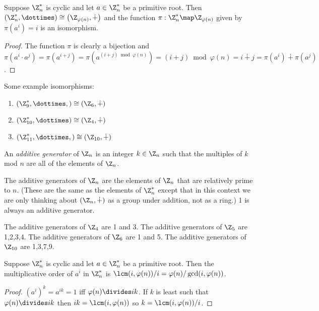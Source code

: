 \documentclass[oneside,12pt]{amsart}
\begin{document}
\begin{theorem}
Suppose $\Z^*_n$ is cyclic and let $a\in\Z^*_n$ be a primitive root. Then $\left(\Z^*_n, \dottimes\right ) \cong \left(\Z_{\varphi(n)},\dotplus \right)$
and the function $\pi:\Z^*_n\map\Z_{\varphi(n)}$ given by $\pi(a^i) = i$ is an isomorphism.
\end{theorem}
\begin{proof}
The function $\pi$ is clearly a bijection and $\pi(a^i \cdot a^j) = \pi(a^{i+j}) = \pi(a^{(i+j)\bmod \varphi(n)}) = (i+j)\bmod \varphi(n) = i \dotplus j = \pi(a^i) \dotplus \pi(a^j)$.
\end{proof}

\begin{in_class_example} Some example isomorphisms:
\begin{enumerate}
\item $\left(\Z^*_9, \dottimes, \right) \cong \left(\Z_6, \dotplus \right)$
\item $\left(\Z^*_{10},\dottimes \right) \cong \left(\Z_4, \dotplus \right )$
\item $\left(\Z^*_{11}, \dottimes, \right) \cong \left(\Z_{10}, \dotplus \right)$
\end{enumerate}
\end{in_class_example}

\begin{definition}
An \emph{additive generator} of $\Z_n$ is an integer $k\in\Z_n$ such that the multiples of $k$ mod $n$ are all of the elements of $\Z_n$.
\end{definition}

The additive generators of $\Z_n$ are the elements of $\Z_n$ that are relatively prime to $n$. (These are the same as the elements of $\Z^*_n$ except that
in this context we are only thinking about $\left(\Z_n,\dotplus\right)$ as a group under addition, not as a ring.)
1 is always an additive generator.

\begin{in_class_example}
The additive generators of $\Z_4$ are 1 and 3. The additive generators of $\Z_5$ are 1,2,3,4. The additive generators of $\Z_6$ are 1 and 5.
The additive generators of $\Z_{10}$ are 1,3,7,9.
\end{in_class_example}


\begin{lemma}
Suppose $\Z^*_n$ is cyclic and let $a\in\Z^*_n$ be a primitive root. 
Then the multiplicative order of $a^i$ in $\Z^*_n$ is $\lcm(i,\varphi(n))/i = \varphi(n)/\gcd(i,\varphi(n))$.
\end{lemma}
\begin{proof}
$(a^i)^k=a^{ik}=1$ iff $\varphi(n)\divides ik$. If $k$ is least such that $\varphi(n)\divides ik$ then $ik=\lcm(i, \varphi(n))$ so $k=\lcm(i,\varphi(n))/i$.
\end{proof}
\end{document}
